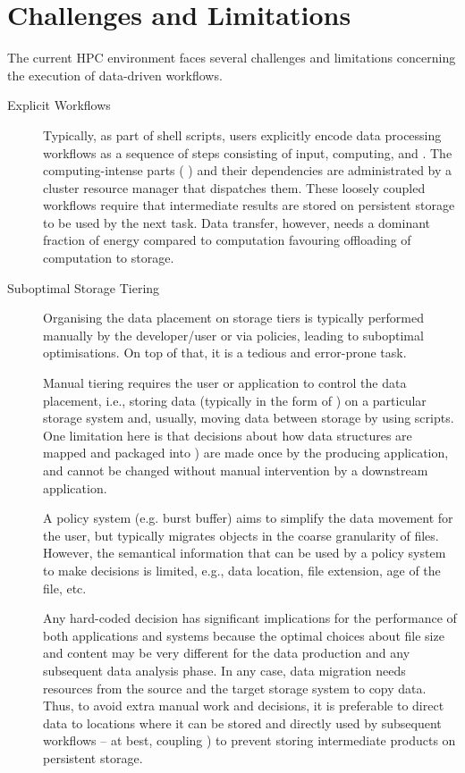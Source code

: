 \documentclass[a4paper]{article}
\begin{document}
\section{Challenges and Limitations}
\label{sec:challenges}
The current HPC environment faces several challenges and limitations concerning the execution of data-driven workflows.

\begin{description}
\item[Explicit Workflows]

Typically, as part of shell scripts, users explicitly encode data processing workflows as a sequence of steps consisting of input, computing, and \sout{{\color{blue}{output}}} {\color{cyan}{products}}.
The computing-intense parts ({\color{blue}{jobs}} {\color{cyan}{tasks?}}) and their dependencies are administrated by a cluster resource manager that dispatches them.
These loosely coupled workflows require that intermediate results are stored on persistent storage to be used by the next task.
Data transfer, however, needs a dominant fraction of energy compared to computation favouring offloading of computation to storage.

\item[Suboptimal Storage Tiering]

Organising the data placement on storage tiers is typically performed manually by the developer/user or via policies, leading to suboptimal optimisations. On top of that, it is a tedious and error-prone task.

Manual tiering requires the user or application to control the data placement, i.e., storing data (typically in the form of \sout{{\color{blue}{files}}} {\color{cyan}{datasets}}) on a particular storage system and, usually, moving data between storage by using scripts.
One limitation here is that decisions about how data structures are mapped and packaged into \sout{{\color{blue}{files}}} {\color{cyan}{datasets}}) are made once by the producing application, and cannot be changed without manual intervention by a downstream application.

A policy system (e.g. burst buffer) aims to simplify the data movement for the user, but typically migrates objects in the coarse granularity of files.
However, the semantical information that can be used by a policy system to make decisions is limited, e.g., data location, file extension, age of the file, etc.

Any hard-coded decision has significant implications for the performance of both applications and systems because the optimal choices about file size and content may be very different for the data production and any subsequent data analysis phase.
In any case, data migration needs resources from the source {\color{cyan}{source? the machine?}} and the target storage system to copy data.
Thus, to avoid extra manual work and decisions, it is preferable to direct data to locations where it can be stored and directly used by subsequent workflows -- at best, coupling \sout{{\color{blue}{the data source producing data with a data consumer}}} {\color{cyan}{the data source with the data consumer}}) to prevent storing intermediate products on persistent storage.


\end{description}
\end{document}
